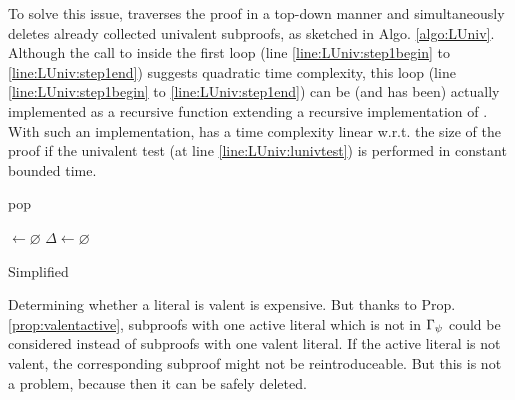 \documentclass{llncs}
\begin{document}
To solve this issue, {\LowerUnivalents} traverses the proof in a top-down manner and simultaneously
deletes already collected univalent subproofs, as sketched in Algo. \ref{algo:LUniv}.  Although the
call to  inside the first loop (line \ref{line:LUniv:step1begin} to
\ref{line:LUniv:step1end}) suggests quadratic time complexity, this loop (line
\ref{line:LUniv:step1begin} to \ref{line:LUniv:step1end}) can be (and has been) actually implemented
as a recursive function extending a recursive implementation of . With such an
implementation, {\LowerUnivalents} has a time complexity linear w.r.t. the size of the proof if the
univalent test (at line \ref{line:LUniv:lunivtest}) is performed in constant bounded time. 




\begin{algorithm}[bt]
  \BlankLine

   {pop}

  \Univ $\leftarrow \varnothing$ \;
  $\Delta \leftarrow \varnothing$ \;
  \BlankLine

  \BlankLine


  \caption{Simplified \LowerUnivalents}
  \label{algo:LUniv}
\end{algorithm}

Determining whether a literal is valent is expensive. But thanks to Prop. \ref{prop:valentactive},
subproofs with one active literal which is not in $\Gamma_{\psi}$ could be considered instead
of subproofs with one valent literal.  If the active literal is not valent, the corresponding
subproof might not be reintroduceable. But this is not a problem, because then it can be safely deleted.
\end{document}
